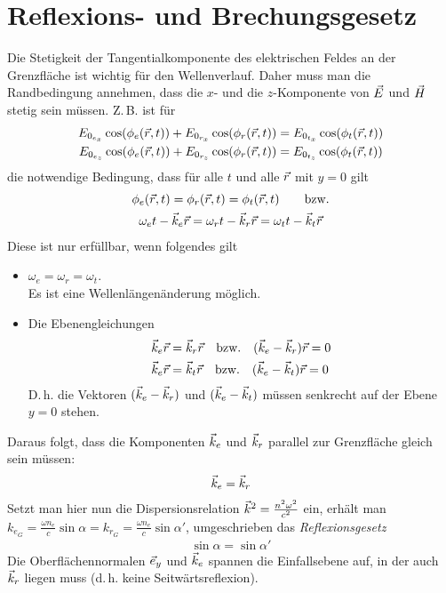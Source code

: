 \section{Reflexions- und Brechungsgesetz}
Die Stetigkeit der Tangentialkomponente des elektrischen Feldes an der
Grenzfläche ist wichtig für den Wellenverlauf.
Daher muss man die Randbedingung annehmen, dass die $x$- und die
$z$-Komponente von $\vec{E}$ und $\vec{H}$ stetig sein müssen.
Z.\,B. ist für
\begin{align*}
  E_{0_{e_x}} \cos(\phi_e(\vec{r},t)) 
  +  E_{0_{r_x}} \cos(\phi_r(\vec{r},t)) 
  &=   E_{0_{t_x}} \cos(\phi_t(\vec{r},t)) \\
  E_{0_{e_z}} \cos(\phi_e(\vec{r},t)) 
  +  E_{0_{r_z}} \cos(\phi_r(\vec{r},t)) 
  &=   E_{0_{t_z}} \cos(\phi_t(\vec{r},t)) \\
\end{align*}
die notwendige Bedingung, dass für alle $t$ und alle $\vec{r}$
mit $y=0$ gilt
\begin{gather*}
  \phi_e(\vec{r}, t) = \phi_r(\vec{r},t) = \phi_t(\vec{r}, t) 
  \qquad\text{bzw.}\\
  \omega_et- \vec{k}_e\vec{r} = \omega_rt- \vec{k}_r\vec{r} = \omega_tt- \vec{k}_t\vec{r}
\end{gather*}
Diese ist nur erfüllbar, wenn folgendes gilt
\begin{itemize}
\item $\omega_e=\omega_r=\omega_t$.\\
   Es ist eine Wellenlängenänderung möglich.
\item Die Ebenengleichungen
  \begin{align*}
    \vec{k}_e\vec{r} &= \vec{k}_r\vec{r} \quad\text{bzw.} \quad(\vec{k}_e-\vec{k}_r)\vec{r}=0\\
    \vec{k}_e\vec{r} &= \vec{k}_t\vec{r} \quad\text{bzw.} \quad(\vec{k}_e-\vec{k}_t)\vec{r}=0
  \end{align*}
  D.\,h. die Vektoren $(\vec{k}_e-\vec{k}_r)$
  und $(\vec{k}_e-\vec{k}_t)$ müssen senkrecht auf der Ebene $y=0$ stehen.
\end{itemize}
Daraus folgt, dass die Komponenten $\vec{k}_e$ und $\vec{k}_r$ parallel
zur Grenzfläche gleich sein müssen:
\begin{gather*}
  \vec{k}_e = \vec{k}_r
\end{gather*}
Setzt man hier nun die Dispersionsrelation 
$\vec{k}^2 = \frac{n^2\omega^2}{c^2}$ ein, erhält man
$k_{e_G} = \frac{\omega n_e}{c}\sin\alpha = k_{r_G} 
= \frac{\omega n_e}{c}\sin\alpha'$, umgeschrieben das
\emph{Reflexionsgesetz}
\begin{gather*}
  \sin\alpha = \sin\alpha'
\end{gather*}
Die Oberflächennormalen $\vec{e}_y$ und $\vec{k}_e$ spannen die
Einfallsebene auf, in der auch $\vec{k}_r$ liegen muss (d.\,h. keine
Seitwärtsreflexion).

